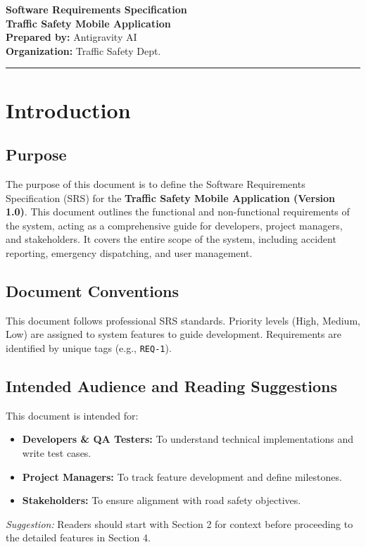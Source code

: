 \documentclass[11pt,a4paper]{article}
\begin{document}
\begin{center}
    {\Huge \textbf{Software Requirements Specification}} \\
    \vspace{0.3cm}
    {\LARGE \textbf{Traffic Safety Mobile Application}} \\
    \vspace{0.6cm}
    \textbf{Prepared by:} Antigravity AI \\
    \vspace{0.2cm}
    \textbf{Organization:} Traffic Safety Dept. \\
    \vspace{0.4cm}
    \hrule
\end{center}

\tableofcontents
\newpage

\section{Introduction}

\subsection{Purpose}
The purpose of this document is to define the Software Requirements Specification (SRS) for the \textbf{Traffic Safety Mobile Application (Version 1.0)}. This document outlines the functional and non-functional requirements of the system, acting as a comprehensive guide for developers, project managers, and stakeholders. It covers the entire scope of the system, including accident reporting, emergency dispatching, and user management.

\subsection{Document Conventions}
This document follows professional SRS standards. Priority levels (High, Medium, Low) are assigned to system features to guide development. Requirements are identified by unique tags (e.g., \texttt{REQ-1}).

\subsection{Intended Audience and Reading Suggestions}
This document is intended for:
\begin{itemize}
    \item \textbf{Developers \& QA Testers:} To understand technical implementations and write test cases.
    \item \textbf{Project Managers:} To track feature development and define milestones.
    \item \textbf{Stakeholders:} To ensure alignment with road safety objectives.
\end{itemize}
\textit{Suggestion:} Readers should start with Section 2 for context before proceeding to the detailed features in Section 4.
\end{document}
